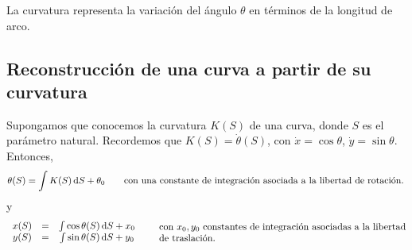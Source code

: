 La curvatura representa la variación del ángulo $\theta$ en términos de la longitud de arco.
\subsection{Reconstrucción de una curva a partir de su curvatura}
Supongamos que conocemos la curvatura $K(S)$ de una curva, donde $S$ es el parámetro natural. Recordemos que $K(S)=\dot{\theta}(S)$, con $\dot{x}=\cos{\theta}$, $\dot{y}=\sin{\theta}$. Entonces,
$$
\theta(S)=\int K(S) \odif{S} + \theta_0 \qquad \text{\parbox{10.5cm}{con una constante de integración asociada a la libertad de rotación.}}
$$
y
$$
\begin{array}{ccc}
     x(S)&=&\int \cos{\theta(S)} \odif{S} + x_0 \\
     y(S)&=&\int \sin{\theta(S)} \odif{S} + y_0
\end{array} \qquad \text{\parbox{9cm}{con $x_0,y_0$ constantes de integración asociadas a la libertad de traslación.}}
$$
